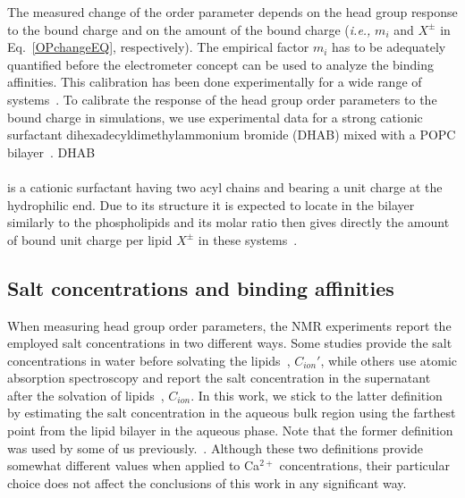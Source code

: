 \documentclass[journal=jpcbfk,manuscript=article]{achemso}
\begin{document}
The measured change of the order parameter depends on the head group response to the bound charge and on the amount of the bound charge (\textit{i.e.,} $m_i$ and $X^\pm$ in Eq.~\ref{OPchangeEQ}, respectively).  The empirical factor $m_i$ has to be adequately quantified before the electrometer concept can be used to analyze the binding affinities. This calibration has been done experimentally for a wide range of systems~\cite{seelig87, beschiasvili91}. To calibrate the response of the head group order parameters to the bound charge in simulations, we use experimental data for a strong cationic surfactant dihexadecyldimethylammonium bromide  (DHAB) mixed with a POPC bilayer~\cite{scherer89}. DHAB\\[0.5cm]
\vspace{0.5cm} \\
is a cationic surfactant having two acyl chains and bearing a unit charge at the hydrophilic end. Due to its structure it is expected to locate in the bilayer similarly to the phospholipids and its molar ratio then gives directly the amount of bound unit charge per lipid $X^\pm$ in these systems~\cite{scherer89}.

\subsection{Salt concentrations and binding affinities}
When measuring head group order parameters, the NMR experiments report the employed salt concentrations in two different ways.
Some studies provide the salt concentrations in water before solvating the lipids~\cite{akutsu81}, $C_{ion}'$,
while others use atomic absorption spectroscopy and report the salt concentration in
the supernatant after the solvation of lipids~\cite{altenbach84}, $C_{ion}$. In this work,
we stick to the latter definition by estimating the salt concentration in the aqueous
bulk region using the farthest point from the lipid bilayer in the aqueous phase.
Note that the former definition was used by some of us previously.~\cite{catte16}.
Although these two definitions provide somewhat different values when applied
to Ca$^{2+}$ concentrations, their particular choice does not affect the conclusions of this work in any significant way.
\end{document}
